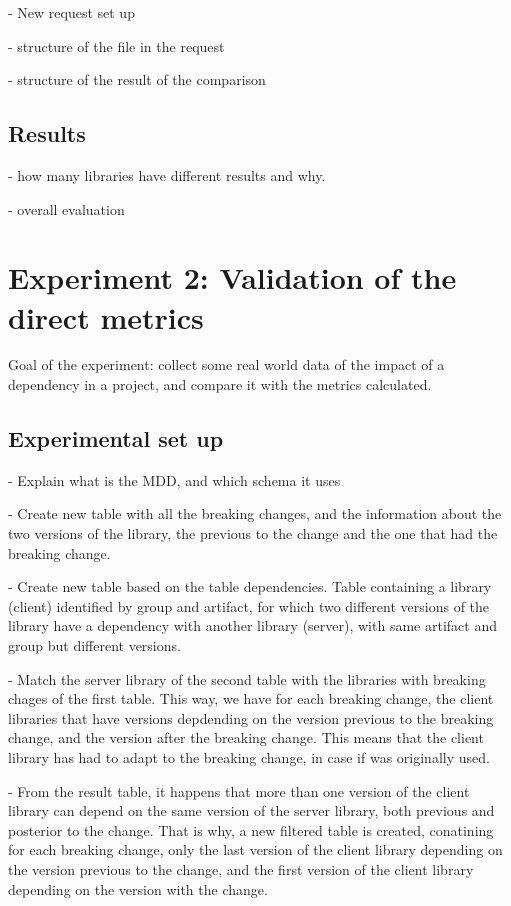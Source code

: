 - New request set up

- structure of the file in the request

- structure of the result of the comparison

\subsection{Results}

- how many libraries have different results and why.

- overall evaluation

\section{Experiment 2: Validation of the direct metrics}

Goal of the experiment: collect some real world data of the impact of a dependency in a project, and compare it with the metrics calculated.


\subsection{Experimental set up}
- Explain what is the MDD, and which schema it uses

- Create new table with all the breaking changes, and the information about the two versions of the library, the previous to the change and the one that had the breaking change.

- Create new table based on the table dependencies. Table containing a library (client) identified by group and artifact, for which two different versions of the library have a dependency with another library (server), with same artifact and group but different versions.

- Match the server library of the second table with the libraries with breaking chages of the first table. This way, we have for each breaking change, the client libraries that have versions depdending on the version previous to the breaking change, and the version after the breaking change. This means that the client library has had to adapt to the breaking change, in case if was originally used.

- From the result table, it happens that more than one version of the client library can depend on the same version of the server library, both previous and posterior to the change. That is why, a new filtered table is created, conatining for each breaking change, only the last version of the client library depending on the version previous to the change, and the first version of the client library depending on the version with the change.

